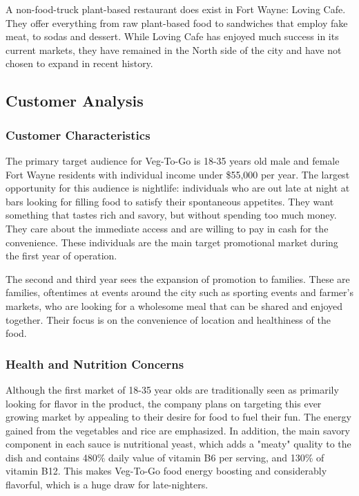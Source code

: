 \documentclass[12pt, letterpaper]{article}
\newcommand{\companyname}{Veg-To-Go}
\begin{document}
A non-food-truck plant-based restaurant does exist in Fort Wayne: Loving Cafe. They offer everything from raw plant-based food to sandwiches that employ fake meat, to sodas and dessert.  While Loving Cafe has enjoyed much success in its current markets, they have remained in the North side of the city and have not chosen to expand in recent history.

\subsection{Customer Analysis}

\subsubsection{Customer Characteristics}
The primary target audience for Veg-To-Go is 18-35 years old male and female Fort Wayne residents with individual income under \$55,000 per year. The largest opportunity for this audience is nightlife: individuals who are out late at night at bars looking for filling food to satisfy their spontaneous appetites. They want something that tastes rich and savory, but without spending too much money. They care about the immediate access and are willing to pay in cash for the convenience. These individuals are the main target promotional market during the first year of operation. 

The second and third year sees the expansion of promotion to families. These are families, oftentimes at events around the city such as sporting events and farmer's markets, who are looking for a wholesome meal that can be shared and enjoyed together. Their focus is on the convenience of location and healthiness of the food.  

\subsubsection{Health and Nutrition Concerns}
Although the first market of 18-35 year olds are traditionally seen as primarily looking for flavor in the product, the company plans on targeting this ever growing market by appealing to their desire for food to fuel their fun.  The energy gained from the vegetables and rice are emphasized.  In addition, the main savory component in each sauce is nutritional yeast, which adds a "meaty" quality to the dish and contains 480\% daily value of vitamin B6 per serving, and 130\% of vitamin B12. \cite{yeast} This makes \companyname{} food energy boosting and considerably flavorful, which is a huge draw for late-nighters.
\end{document}
